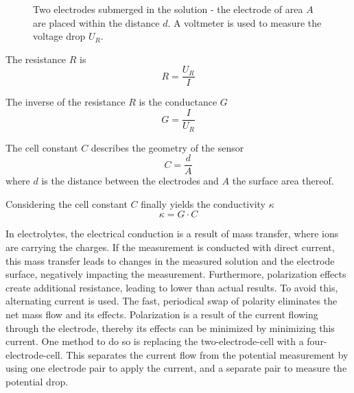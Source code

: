 \begin{figure}
	\begin{center}
    	\tikzset{external/export next=false}
		\caption[Two electrodes submerged in the solution]{Two electrodes submerged in the solution - the electrode of area $A$ are placed within the distance $d$. A voltmeter is used to measure the voltage drop $U_R$.}
		\label{fig:elec}
	\end{center}
\end{figure}

The resistance $ R $ is
\begin{equation}
	R = \dfrac{U_R}{I}
\label{eq:R}
\end{equation}

The inverse of the resistance $ R $ is the conductance $ G $
\begin{equation}
	G = \dfrac{I}{U_R}
\label{eq:G}
\end{equation}

The cell constant $ C $ describes the geometry of the sensor
\begin{equation}
	C = \dfrac{d}{A}
\label{eq:C}
\end{equation}
where $ d $ is the distance between the electrodes and $ A $ the surface area thereof. 

Considering the cell constant $ C $ finally yields the conductivity $\kappa$
\begin{equation}
	\kappa = G \cdot C
\label{eq:kappa} 
\end{equation}

In electrolytes, the electrical conduction is a result of mass transfer, where ions are carrying the charges. If the measurement is conducted with direct current, this mass transfer leads to changes in the measured solution and the electrode surface, negatively impacting the measurement. Furthermore, polarization effects create additional resistance, leading to lower than actual results. To avoid this, alternating current is used. The fast, periodical swap of polarity eliminates the net mass flow and its effects. Polarization is a result of the current flowing through the electrode, thereby its effects can be minimized by minimizing this current. One method to do so is replacing the two-electrode-cell with a four-electrode-cell.
This separates the current flow from the potential measurement by using one electrode pair to apply the current, and a separate pair to measure the potential drop. \\

